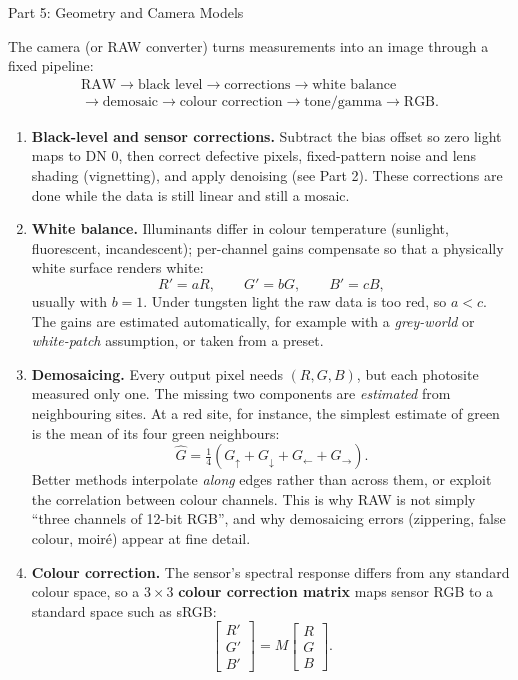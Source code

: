 \documentclass[letterpaper]{article}
\begin{document}
\begin{notes}{Part 5: Geometry and Camera Models}

The camera (or RAW converter) turns measurements into an image through a fixed pipeline:
$$\begin{gathered}\text{RAW}\to\text{black level}\to\text{corrections}\to\text{white balance}\\\to\text{demosaic}\to\text{colour correction}\to\text{tone/gamma}\to\text{RGB}.\end{gathered}$$

\begin{enumerate}[resume=steps]
    \item \textbf{Black-level and sensor corrections.} Subtract the bias offset so zero light maps to DN $0$, then correct defective pixels, fixed-pattern noise and lens shading (vignetting), and apply denoising (see Part 2). These corrections are done while the data is still linear and still a mosaic.
    \item\label{step:wb} \textbf{White balance.} Illuminants differ in colour temperature (sunlight, fluorescent, incandescent); per-channel gains compensate so that a physically white surface renders white:
    $$R' = aR,\qquad G' = bG,\qquad B' = cB,$$
    usually with $b=1$. Under tungsten light the raw data is too red, so $a<c$. The gains are estimated automatically, for example with a \emph{grey-world} or \emph{white-patch} assumption, or taken from a preset.
    \item \textbf{Demosaicing.} Every output pixel needs $(R,G,B)$, but each photosite measured only one. The missing two components are \emph{estimated} from neighbouring sites. At a red site, for instance, the simplest estimate of green is the mean of its four green neighbours:
    $$\hat G = \tfrac14(G_{\uparrow}+G_{\downarrow}+G_{\leftarrow}+G_{\rightarrow}).$$
    Better methods interpolate \emph{along} edges rather than across them, or exploit the correlation between colour channels. This is why RAW is not simply ``three channels of 12-bit RGB'', and why demosaicing errors (zippering, false colour, moiré) appear at fine detail.
    \item \textbf{Colour correction.} The sensor's spectral response differs from any standard colour space, so a $3\times3$ \textbf{colour correction matrix} maps sensor RGB to a standard space such as sRGB:
    $$\begin{bmatrix}R'\\G'\\B'\end{bmatrix} = M\begin{bmatrix}R\\G\\B\end{bmatrix}.$$

\end{enumerate}
\end{notes}
\end{document}
